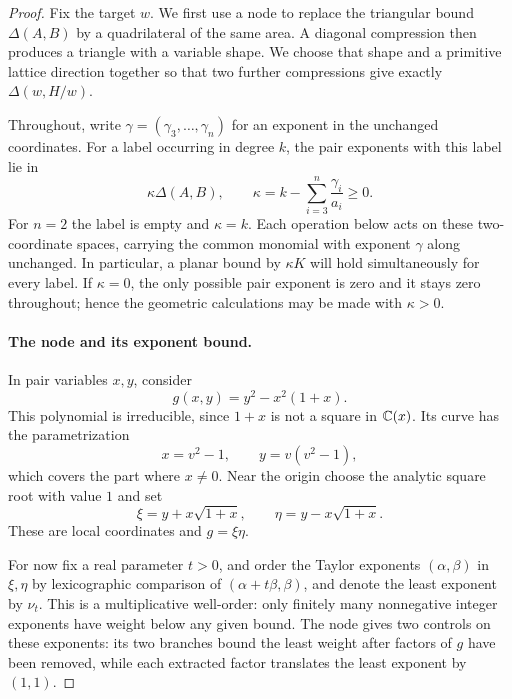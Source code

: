 \begin{proof}
Fix the target $w$.  We first use a node to replace the triangular bound
$\Delta(A,B)$ by a quadrilateral of the same area.  A diagonal compression
then produces a triangle with a variable shape.  We choose that shape and a
primitive lattice direction together so that two further compressions give
exactly $\Delta(w,H/w)$.

Throughout, write $\gamma=(\gamma_3,\ldots,\gamma_n)$ for an exponent in
the unchanged coordinates.  For a label occurring in degree $k$, the pair
exponents with this label lie in
\begin{equation}\label{eq:residual-degree}
 \kappa\Delta(A,B),\qquad
 \kappa=k-\sum_{i=3}^n\frac{\gamma_i}{a_i}\ge0.
\end{equation}
For $n=2$ the label is empty and $\kappa=k$.  Each operation below acts on
these two-coordinate spaces, carrying the common monomial with exponent
$\gamma$ along unchanged.  In particular, a planar bound by $\kappa K$
will hold simultaneously for every label.  If $\kappa=0$, the only possible
pair exponent is zero and it stays zero throughout; hence the geometric
calculations may be made with $\kappa>0$.

\paragraph{The node and its exponent bound.}
In pair variables $x,y$, consider
\begin{equation}\label{eq:node-polynomial}
 g(x,y)=y^2-x^2(1+x).
\end{equation}
This polynomial is irreducible, since $1+x$ is not a square in $\mathbb C(x)$.
Its curve has the parametrization
\begin{equation}\label{eq:node-parametrization}
 x=v^2-1,\qquad y=v(v^2-1),
\end{equation}
which covers the part where $x\ne0$.  Near the origin choose the analytic
square root with value $1$ and set
\begin{equation}\label{eq:node-coordinates}
 \xi=y+x\sqrt{1+x},\qquad
 \eta=y-x\sqrt{1+x}.
\end{equation}
These are local coordinates and $g=\xi\eta$.

For now fix a real parameter $t>0$, and order the Taylor exponents $(\alpha,\beta)$
in $\xi,\eta$ by lexicographic comparison of
$(\alpha+t\beta,\beta)$, and denote the least exponent by $\nu_t$.
This is a multiplicative well-order: only finitely many nonnegative integer
exponents have weight below any given bound.  The node gives two controls
on these exponents: its two branches bound the least weight after factors
of $g$ have been removed, while each extracted factor translates the least
exponent by $(1,1)$.


\end{proof}
